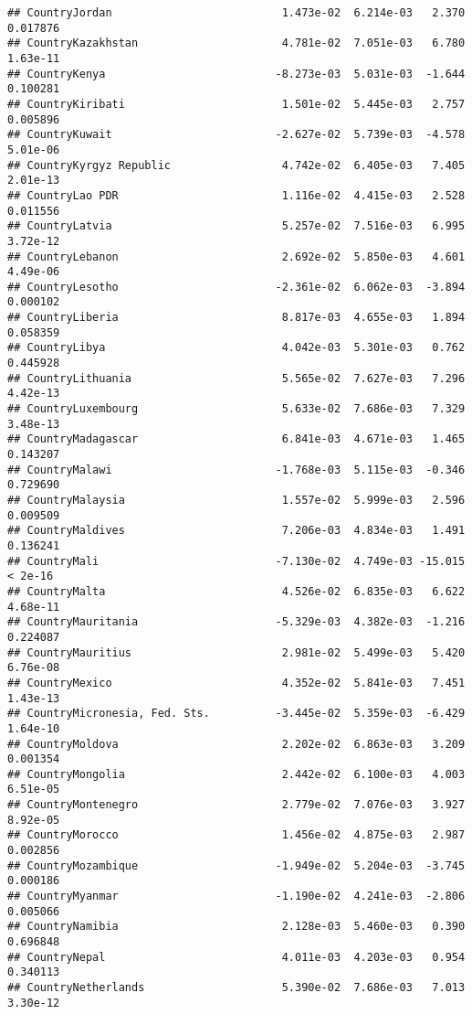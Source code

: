 \documentclass[
]{article}
\begin{document}
\begin{verbatim}
## CountryJordan                          1.473e-02  6.214e-03   2.370 0.017876
## CountryKazakhstan                      4.781e-02  7.051e-03   6.780 1.63e-11
## CountryKenya                          -8.273e-03  5.031e-03  -1.644 0.100281
## CountryKiribati                        1.501e-02  5.445e-03   2.757 0.005896
## CountryKuwait                         -2.627e-02  5.739e-03  -4.578 5.01e-06
## CountryKyrgyz Republic                 4.742e-02  6.405e-03   7.405 2.01e-13
## CountryLao PDR                         1.116e-02  4.415e-03   2.528 0.011556
## CountryLatvia                          5.257e-02  7.516e-03   6.995 3.72e-12
## CountryLebanon                         2.692e-02  5.850e-03   4.601 4.49e-06
## CountryLesotho                        -2.361e-02  6.062e-03  -3.894 0.000102
## CountryLiberia                         8.817e-03  4.655e-03   1.894 0.058359
## CountryLibya                           4.042e-03  5.301e-03   0.762 0.445928
## CountryLithuania                       5.565e-02  7.627e-03   7.296 4.42e-13
## CountryLuxembourg                      5.633e-02  7.686e-03   7.329 3.48e-13
## CountryMadagascar                      6.841e-03  4.671e-03   1.465 0.143207
## CountryMalawi                         -1.768e-03  5.115e-03  -0.346 0.729690
## CountryMalaysia                        1.557e-02  5.999e-03   2.596 0.009509
## CountryMaldives                        7.206e-03  4.834e-03   1.491 0.136241
## CountryMali                           -7.130e-02  4.749e-03 -15.015  < 2e-16
## CountryMalta                           4.526e-02  6.835e-03   6.622 4.68e-11
## CountryMauritania                     -5.329e-03  4.382e-03  -1.216 0.224087
## CountryMauritius                       2.981e-02  5.499e-03   5.420 6.76e-08
## CountryMexico                          4.352e-02  5.841e-03   7.451 1.43e-13
## CountryMicronesia, Fed. Sts.          -3.445e-02  5.359e-03  -6.429 1.64e-10
## CountryMoldova                         2.202e-02  6.863e-03   3.209 0.001354
## CountryMongolia                        2.442e-02  6.100e-03   4.003 6.51e-05
## CountryMontenegro                      2.779e-02  7.076e-03   3.927 8.92e-05
## CountryMorocco                         1.456e-02  4.875e-03   2.987 0.002856
## CountryMozambique                     -1.949e-02  5.204e-03  -3.745 0.000186
## CountryMyanmar                        -1.190e-02  4.241e-03  -2.806 0.005066
## CountryNamibia                         2.128e-03  5.460e-03   0.390 0.696848
## CountryNepal                           4.011e-03  4.203e-03   0.954 0.340113
## CountryNetherlands                     5.390e-02  7.686e-03   7.013 3.30e-12

\end{verbatim}
\end{document}
